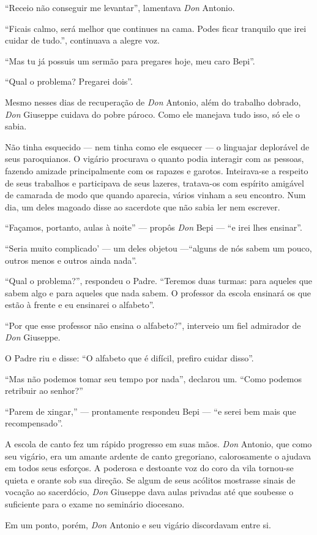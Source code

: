 \documentclass[12pt,a4paper,oneside]{book}
\begin{document}
\quad ``Receio não conseguir me levantar'', lamentava \emph{Don} Antonio.

\quad ``Ficais calmo, será melhor que continues na cama. Podes ficar tranquilo que irei cuidar de tudo.'', continuava a alegre voz.

\quad ``Mas tu já possuis um sermão para pregares hoje, meu caro Bepi''.

\quad ``Qual o problema? Pregarei dois''.

\quad Mesmo nesses dias de recuperação de \emph{Don} Antonio, além do trabalho dobrado, \emph{Don} Giuseppe cuidava do pobre pároco. Como ele manejava tudo isso, só ele o sabia.

\quad Não tinha esquecido --- nem tinha como ele esquecer --- o linguajar deplorável de seus paroquianos. O vigário procurava o quanto podia interagir com as pessoas, fazendo amizade principalmente com os rapazes e garotos. Inteirava-se a respeito de seus trabalhos e participava de seus lazeres, tratava-os com espírito amigável de camarada de modo que quando aparecia, vários vinham a seu encontro. Num dia, um deles magoado disse ao sacerdote que não sabia ler nem escrever.

\quad ``Façamos, portanto, aulas à noite'' --- propôs \emph{Don} Bepi --- ``e irei lhes ensinar''.

\quad ``Seria muito complicado' --- um deles objetou ---``alguns de nós sabem um pouco, outros menos e outros ainda nada''.

\quad ``Qual o problema?'', respondeu o Padre. ``Teremos duas turmas: para aqueles que sabem algo e para aqueles que nada sabem. O professor da escola ensinará os que estão à frente e eu ensinarei o alfabeto''.

\quad ``Por que esse professor não ensina o alfabeto?'', interveio um fiel admirador de \emph{Don} Giuseppe.

\quad O Padre riu e disse: ``O alfabeto que é difícil, prefiro cuidar disso''.

\quad  ``Mas não podemos tomar seu tempo por nada'', declarou um. ``Como podemos retribuir ao senhor?''

\quad ``Parem de xingar,'' --- prontamente respondeu Bepi --- ``e serei bem mais que recompensado''.

\quad A escola de canto fez um rápido progresso em suas mãos. \emph{Don} Antonio, que como seu vigário, era um amante ardente de canto gregoriano, calorosamente o ajudava em todos seus esforços. A poderosa e destoante voz do coro da vila tornou-se quieta e orante sob sua direção. Se algum de seus acólitos mostrasse sinais de vocação ao sacerdócio, \emph{Don} Giuseppe dava aulas privadas até que soubesse o suficiente para o exame no seminário diocesano.

\quad Em um ponto, porém, \emph{Don} Antonio e seu vigário discordavam entre si.
\end{document}
